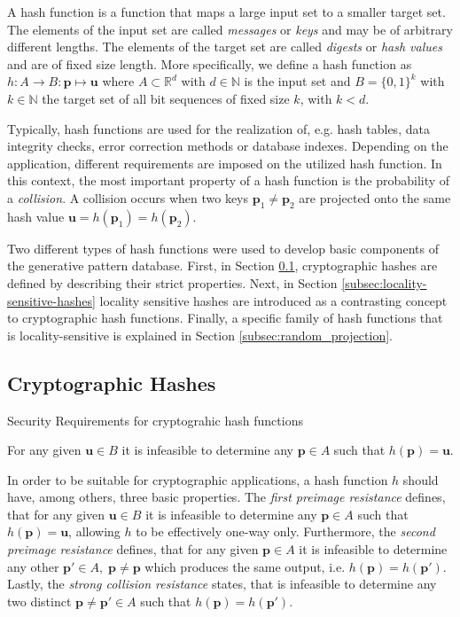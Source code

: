 A hash function is a function that maps a large input set to a smaller target set. The elements of the input set are called \textit{messages} or \textit{keys} and may be of arbitrary different lengths. The elements of the target set are called \textit{digests} or \textit{hash values} and are of fixed size length. More specifically, we define a hash function as $h: A \rightarrow B : \bm{p} \mapsto \bm{u}$ where $A \subset \mathbb{R}^d$ with $d \in \mathbb{N}$ is the input set and $B=\{0, 1\}^k$ with $k \in \mathbb{N}$ the target set of all bit sequences of fixed size $k$, with $k < d$. 

Typically, hash functions are used for the realization of, e.g. hash tables, data integrity checks, error correction methods or database indexes. Depending on the application, different requirements are imposed on the utilized hash function. In this context, the most important property of a hash function is the probability of a \textit{collision}. A collision occurs when two keys $\bm{p}_1 \neq \bm{p}_2$ are projected onto the same hash value $\bm{u} = h(\bm{p}_1) = h(\bm{p}_2)$. 

Two different types of hash functions were used to develop basic components of the generative pattern database. First, in Section \ref{subsec:cryptographic_hashes}, cryptographic hashes are defined by describing their strict properties. Next, in Section \ref{subsec:locality-sensitive-hashes} locality sensitive hashes are introduced as a contrasting concept to cryptographic hash functions. Finally, a specific family of hash functions that is locality-sensitive is explained in Section \ref{subsec:random_projection}.

\subsection{Cryptographic Hashes} \label{subsec:cryptographic_hashes}
Security Requirements for cryptograhic hash functions \cite[349]{williamcryptography}

\begin{definition}
    For any given $\bm{u} \in B$ it is infeasible to determine any $\bm{p} \in A$ such that $h(\bm{p})=\bm{u}$.
\end{definition}
In order to be suitable for cryptographic applications, a hash function $h$ should have, among others, three basic properties. The \textit{first preimage resistance} defines, that for any given $\bm{u} \in B$ it is infeasible to determine any $\bm{p} \in A$ such that $h(\bm{p})=\bm{u}$, allowing $h$ to be effectively one-way only. Furthermore, the \textit{second preimage resistance} defines, that for any given $\bm{p} \in A$ it is infeasible to determine any other $\bm{p}' \in A,\; \bm{p} \neq \bm{p}$ which produces the same output, i.e. $h(\bm{p})=h(\bm{p}')$. Lastly, the \textit{strong collision resistance} states, that is infeasible to determine any two distinct $\bm{p} \neq \bm{p}' \in A$ such that $h(\bm{p})=h(\bm{p}')$.

